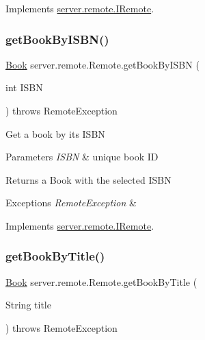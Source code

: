 Implements \hyperlink{interfaceserver_1_1remote_1_1_i_remote_a3ff8752a1911b6ca54fc4a04af90fe7a}{server.\+remote.\+I\+Remote}.

\mbox{\label{classserver_1_1remote_1_1_remote_a36ffc6f95ea75ad7d393ea296e1bc0cc}} 
\subsubsection{\texorpdfstring{get\+Book\+By\+I\+S\+B\+N()}{getBookByISBN()}}
{\footnotesize\ttfamily \hyperlink{classserver_1_1data_1_1_book}{Book} server.\+remote.\+Remote.\+get\+Book\+By\+I\+S\+BN (\begin{DoxyParamCaption}\item[{int}]{I\+S\+BN }\end{DoxyParamCaption}) throws Remote\+Exception}

Get a book by its I\+S\+BN 
\begin{DoxyParams}{Parameters}
{\em I\+S\+BN} & unique book ID \\
\hline
\end{DoxyParams}
\begin{DoxyReturn}{Returns}
a Book with the selected I\+S\+BN 
\end{DoxyReturn}

\begin{DoxyExceptions}{Exceptions}
{\em Remote\+Exception} & \\
\hline
\end{DoxyExceptions}


Implements \hyperlink{interfaceserver_1_1remote_1_1_i_remote_a736183bf7a57f78acf11fb78ae0f0e58}{server.\+remote.\+I\+Remote}.

\mbox{\label{classserver_1_1remote_1_1_remote_a560427fc017e15f04e12bd880e6f086e}} 
\subsubsection{\texorpdfstring{get\+Book\+By\+Title()}{getBookByTitle()}}
{\footnotesize\ttfamily \hyperlink{classserver_1_1data_1_1_book}{Book} server.\+remote.\+Remote.\+get\+Book\+By\+Title (\begin{DoxyParamCaption}\item[{String}]{title }\end{DoxyParamCaption}) throws Remote\+Exception}

